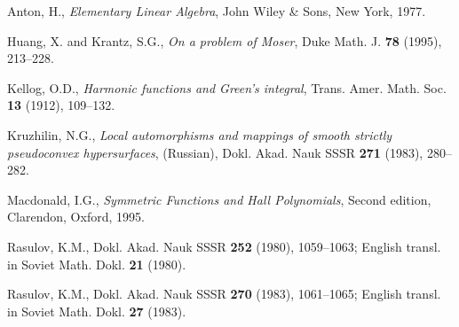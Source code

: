 
%
%
%
%


\begin{thebibliography}{99}

\frenchspacing


Anton, H.,
\emph{Elementary Linear Algebra},
 John Wiley \& Sons, New York, 1977.

Huang, X. and Krantz, S.G.,
\emph{On a problem of Moser},
Duke Math. J.
{\bf 78} (1995), 213--228.

Kellog, O.D.,
\emph{Harmonic functions and Green's integral},
Trans. Amer. Math. Soc.
{\bf 13} (1912), 109--132.

Kruzhilin, N.G.,
\emph{Local automorphisms and mappings of smooth strictly
pseudoconvex hypersurfaces},
(Russian),
Dokl. Akad. Nauk SSSR
{\bf 271} (1983), 280--282.

Macdonald, I.G.,
\emph{Symmetric Functions and Hall Polynomials},
Second edition, Clarendon, Oxford, 1995.

Rasulov, K.M.,
Dokl. Akad. Nauk SSSR {\bf 252} (1980), 1059--1063; English transl. in Soviet Math. Dokl.
{\bf 21} (1980).

Rasulov, K.M.,
Dokl. Akad. Nauk SSSR {\bf 270} (1983), 1061--1065; English transl. in Soviet Math. Dokl.
{\bf 27} (1983).


\end{thebibliography}
